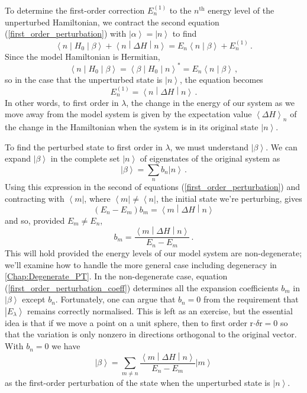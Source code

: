 \documentclass{article}
\theoremstyle{plain}\theoremheaderfont{\normalfont\itshape}\theorembodyfont{\rmfamily}\theoremseparator{.}\newtheorem*{rem}{Remark}\newtheorem*{ex}{Example}\newtheorem*{proof}{Proof}\newtheorem*{altp}{Alternative proof}
\theoremstyle{plain}\theoremheaderfont{\normalfont\bfseries}\theorembodyfont{\rmfamily}\theoremseparator{.}\newtheorem{thm}{Theorem}[section]\newtheorem{lem}[thm]{Lemma}\newtheorem{prop}[thm]{Proposition}\newtheorem*{cor}{Corollary}\newtheorem{defn}[thm]{Definition}\newtheorem{clm}[thm]{Claim}\newtheorem{clminproof}{Claim}
\theoremstyle{break}\theoremheaderfont{\normalfont\itshape}\theorembodyfont{\rmfamily}\theoremseparator{.\medskip}\newtheorem*{proofskip}{Proof}\newtheorem*{exs}{Examples}\newtheorem*{rems}{Remarks}
\theoremstyle{break}\theoremheaderfont{\normalfont\bfseries}\theorembodyfont{\rmfamily}\theoremseparator{.\medskip}\newtheorem{lemskip}[thm]{Lemma}\newtheorem{defnskip}[thm]{Definition}\newtheorem{propskip}[thm]{Proposition}\newtheorem{thmskip}[thm]{Theorem}
\numberwithin{equation}{section}
\newcommand{\bra}[1]{\left\langle #1 \right|}
\newcommand{\ket}[1]{\left| #1 \right\rangle}
\newcommand{\braket}[2]{\left\langle #1 \middle| #2 \right\rangle}
\newcommand{\mel}[3]{\left\langle #1 \middle| #2 \middle| #3 \right\rangle}
\newcommand{\eval}[1]{\left\langle #1 \right\rangle}
\newcommand{\expval}[2]{\left\langle #2 \middle| #1 \middle| #2 \right\rangle}
\newcommand{\vb}[1]{\bm{\mathrm{#1}}}
\newcommand{\vdot}{\bm{\cdot}}
\begin{document}
    To determine the first-order correction \(E_n^{(1)}\) to the \(n^{\text{th}}\) energy level of the unperturbed Hamiltonian, we contract the second equation (\ref{first_order_perturbation}) with \(\ket{\alpha}=\ket{n}\) to find
    \begin{equation}
        \mel{n}{H_0}{\beta}+\mel{n}{\Delta H}{n}=E_n\braket{n}{\beta}+E_n^{(1)}\,.
    \end{equation}
    Since the model Hamiltonian is Hermitian,
    \begin{equation}
        \mel{n}{H_0}{\beta}=\mel{\beta}{H_0}{n}^*=E_n\braket{n}{\beta}\,,
    \end{equation}
    so in the case that the unperturbed state is \(\ket{n}\), the equation becomes
    \begin{equation}\label{first_order_energy_perturbation}
        E_n^{(1)}=\expval{\Delta H}{n}\,.
    \end{equation}
    In other words, to first order in \(\lambda\), the change in the energy of our system as we move away from the model system is given by the expectation value \(\eval{\Delta H}_n\) of the change in the Hamiltonian when the system is in its original state \(\ket{n}\).

    To find the perturbed state to first order in \(\lambda\), we must understand \(\ket{\beta}\). We can expand \(\ket{\beta}\) in the complete set \(\ket{n}\) of eigenstates of the original system as
    \begin{equation}
        \ket{\beta}=\sum_n b_n\ket{n}\,.
    \end{equation}
    Using this expression in the second of equations (\ref{first_order_perturbation}) and contracting with \(\bra{m}\), where \(\bra{m}\ne\bra{n}\), the initial state we're perturbing, gives
    \begin{equation}
        (E_n-E_m)b_m=\mel{m}{\Delta H}{n}
    \end{equation}
    and so, provided \(E_m\ne E_n\),
    \begin{equation}\label{first_order_perturbation_coeff}
        b_m=\frac{\mel{m}{\Delta H}{n}}{E_n-E_m}\,.
    \end{equation}
    This will hold provided the energy levels of our model system are non-degenerate; we'll examine how to handle the more general case including degeneracy in \cref{Chap:Degenerate_PT}. In the non-degenerate case, equation (\ref{first_order_perturbation_coeff}) determines all the expansion coefficients \(b_m\) in \(\ket{\beta}\) except \(b_n\). Fortunately, one can argue that \(b_n=0\) from the requirement that \(\ket{E_\lambda}\) remains correctly normalised. This is left as an exercise, but the essential idea is that if we move a point on a unit sphere, then to first order \(\vb{r}\vdot\delta\vb{r}=0\) so that the variation is only nonzero in directions orthogonal to the original vector. With \(b_n=0\) we have
    \begin{equation}
        \ket{\beta}=\sum_{m\ne n}\frac{\mel{m}{\Delta H}{n}}{E_n - E_m}\ket{m}
    \end{equation}
    as the first-order perturbation of the state when the unperturbed state is \(\ket{n}\).
\end{document}
